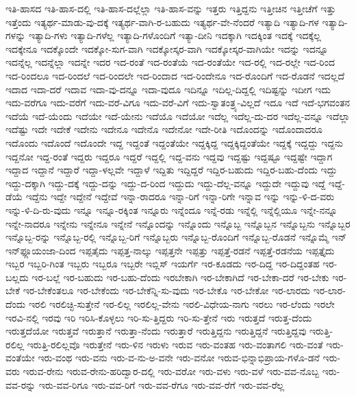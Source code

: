 {ಇತಿ-ಹಾಸದ
ಇತಿ-ಹಾಸ-ದಲ್ಲಿ
ಇತಿ-ಹಾಸ-ದಲ್ಲೆಲ್ಲಾ
ಇತಿ-ಹಾಸ-ವನ್ನು
ಇತ್ತರು
ಇತ್ತಿದ್ದನು
ಇತ್ತೀಚಿನ
ಇತ್ತೀಚೆಗೆ
ಇತ್ತು
ಇತ್ತೆಂದು
ಇತ್ಯರ್ಥ-ಮಾಡು-ವು-ದಕ್ಕೆ
ಇತ್ಯರ್ಥ-ವಾಗಿ-ರ-ಬಹುದು
ಇತ್ಯರ್ಥ-ವೇ-ನೆಂದರೆ
ಇತ್ಯಾದಿ
ಇತ್ಯಾದಿ-ಗಳ
ಇತ್ಯಾದಿ-ಗಳನ್ನು
ಇತ್ಯಾದಿ-ಗಳು
ಇತ್ಯಾದಿ-ಗಳೆಲ್ಲ
ಇತ್ಯಾದಿ-ಗಳೊಂದಿಗೆ
ಇತ್ಯಾ-ದೀನಿ
ಇದಕ್ಕಾಗಿ
ಇದಕ್ಕಿಂತ
ಇದಕ್ಕೆ
ಇದಕ್ಕೆಲ್ಲ
ಇದಕ್ಕೇನೂ
ಇದಕ್ಕೊಂದೇ
ಇದಕ್ಕೋ-ಸುಗ-ವಾಗಿ
ಇದಕ್ಕೋಸ್ಕರ-ವಾಗಿ
ಇದಕ್ಕೋಸ್ಕರ-ವಾಗಿಯೇ
ಇದನ್ನು
ಇದನ್ನೂ
ಇದನ್ನೆಲ್ಲ
ಇದನ್ನೆಲ್ಲಾ
ಇದನ್ನೇ
ಇದರ
ಇದ-ರಂತೆ
ಇದ-ರಂತೆಯೆ
ಇದ-ರಂತೆಯೇ
ಇದ-ರಲ್ಲಿ
ಇದ-ರಲ್ಲೇ
ಇದ-ರಿಂದ
ಇದ-ರಿಂದಲೂ
ಇದ-ರಿಂದಲೆ
ಇದ-ರಿಂದಲೇ
ಇದ-ರಿಂದಾದ
ಇದ-ರಿಂದೇನೂ
ಇದ-ರೊಂದಿಗೆ
ಇದ-ರೊಡನೆ
ಇದಲ್ಲದೆ
ಇದಾದ
ಇದಾ-ದರೆ
ಇದಾವ
ಇದಾ-ವು-ದನ್ನೂ
ಇದಾ-ವುದೂ
ಇದಿನ್ನೂ
ಇದಿಲ್ಲ-ದಿದ್ದಲ್ಲಿ
ಇದಿಷ್ಟನ್ನು
ಇದೀಗ
ಇದು
ಇದು-ವರೆಗೂ
ಇದು-ವರೆಗೆ
ಇದು-ವರೆ-ವಿಗೂ
ಇದು-ವರೆ-ವಿಗೆ
ಇದು-ಸ್ವಾತಂತ್ರ್ಯ-ವಿಲ್ಲದೆ
ಇದೂ
ಇದೆ
ಇದೆ-ಭಗವಂತನ
ಇದೆಯೆ
ಇದೆ-ಯೆಂದು
ಇದೆಯೇ
ಇದೆ-ಯೇನು
ಇದೆಯೊ
ಇದೆಯೋ
ಇದೆಲ್ಲ
ಇದೆಲ್ಲ-ದು-ದರ
ಇದೆಲ್ಲ-ವನ್ನೂ
ಇದೆಲ್ಲಾ
ಇದೆಷ್ಟು
ಇದೇ
ಇದೇಕೆ
ಇದೇನು
ಇದೇನೂ
ಇದೇನೊ
ಇದೇನೋ
ಇದೇ-ರೀತಿ
ಇದೊಂದನ್ನು
ಇದೊಂದಾದರೂ
ಇದೊಂದು
ಇದೊಂದೆ
ಇದೊಂದೇ
ಇದ್ದ
ಇದ್ದಂತೆ
ಇದ್ದಂತೆಯೇ
ಇದ್ದಕ್ಕಿದ್ದ
ಇದ್ದಕ್ಕಿದ್ದಂತೆಯೇ
ಇದ್ದಕ್ಕೆ
ಇದ್ದದ್ದು
ಇದ್ದನು
ಇದ್ದನೋ
ಇದ್ದ-ರಂತೆ
ಇದ್ದರು
ಇದ್ದರೂ
ಇದ್ದರೆ
ಇದ್ದಲ್ಲಿ
ಇದ್ದ-ವನು
ಇದ್ದವು
ಇದ್ದಷ್ಟು
ಇದ್ದಷ್ಟೂ
ಇದ್ದಷ್ಟೇ
ಇದ್ದಾಗ
ಇದ್ದಾದ
ಇದ್ದಾನೆ
ಇದ್ದಾರೆ
ಇದ್ದಾ-ಳಲ್ಲವೇ
ಇದ್ದಾಳೆ
ಇದ್ದಿತು
ಇದ್ದಿದ್ದರೆ
ಇದ್ದಿರ-ಬಹುದು
ಇದ್ದಿರ-ಬಹು-ದೆಂದು
ಇದ್ದು
ಇದ್ದು-ದಕ್ಕಾಗಿ
ಇದ್ದು-ದಕ್ಕೆ
ಇದ್ದು-ದನ್ನು
ಇದ್ದು-ದ-ರಿಂದ
ಇದ್ದುದು
ಇದ್ದು-ದೆಲ್ಲ-ವನ್ನೂ
ಇದ್ದುದೇ
ಇದ್ದುವು
ಇದ್ದೆ
ಇದ್ದೆ-ಡೆಯೆ
ಇದ್ದೆನು
ಇದ್ದೇ
ಇದ್ದೇನೆ
ಇದ್ದೇವೆ
ಇನ್ನಾ-ರಾದರೂ
ಇನ್ನಾ-ರಿಗೆ
ಇನ್ನಾ-ರಿಗೇ
ಇನ್ನಾವ
ಇನ್ನು
ಇನ್ನು-ಳಿ-ದ-ವರು
ಇನ್ನು-ಳಿ-ದಿ-ರು-ವುದು
ಇನ್ನೂ
ಇನ್ನೂ-ರಕ್ಕಿಂತ
ಇನ್ನೂರು
ಇನ್ನೆಂದೂ
ಇನ್ನೆ-ರಡು
ಇನ್ನೆಲ್ಲಿ
ಇನ್ನೆಲ್ಲಿಯೂ
ಇನ್ನೇ-ನನ್ನೂ
ಇನ್ನೇ-ನಾದರೂ
ಇನ್ನೇನು
ಇನ್ನೇನೂ
ಇನ್ನೇನೆ
ಇನ್ನೊಂದನ್ನು
ಇನ್ನೊಂದು
ಇನ್ನೊಬ್ಬ
ಇನ್ನೊಬ್ಬನ
ಇನ್ನೊಬ್ಬನು
ಇನ್ನೊಬ್ಬರ
ಇನ್ನೊಬ್ಬ-ರನ್ನು
ಇನ್ನೊಬ್ಬ-ರಲ್ಲಿ
ಇನ್ನೊಬ್ಬ-ರಿಗೆ
ಇನ್ನೊಬ್ಬರು
ಇನ್ನೊಬ್ಬ-ರೊಂದಿಗೆ
ಇನ್ನೊಬ್ಬ-ರೊಡನೆ
ಇನ್ನೊಮ್ಮೆ
ಇನ್‌
ಇನ್‌ಫ್ಲೂಯಂಜಾ-ದಿಂದ
ಇಪ್ಪತೈದು
ಇಪ್ಪತ್ತ-ನಾಲ್ಕು
ಇಪ್ಪತ್ತನೇ
ಇಪ್ಪತ್ತು
ಇಪ್ಪತ್ತೆ-ರಡನೆ
ಇಪ್ಪತ್ತೆ-ರಡನೆಯ
ಇಪ್ಪತ್ತೈದು
ಇಬ್ಬರ
ಇಬ್ಬರಿ-ಗಿಂತ
ಇಬ್ಬರು
ಇಬ್ಬರೂ
ಇಬ್ಬರೇ
ಇಬ್ಲಿಸ್
ಇಯರ್ಗೆ
ಇರ-ಕೂಡದು
ಇರ-ದಿದ್ದ
ಇರ-ದಿದ್ದಂತಹ
ಇರ-ಬಲ್ಲದು
ಇರ-ಬಲ್ಲೆ
ಇರ-ಬಹುದು
ಇರ-ಬಹು-ದೆಂದು
ಇರಬೇಕಾಗಿ
ಇರ-ಬೇಕಾಗಿದೆ
ಇರ-ಬೇಕಾ-ದರೆ
ಇರ-ಬೇಕು
ಇರ-ಬೇಕೆ
ಇರ-ಬೇಕೆಂತಲೂ
ಇರ-ಬೇಕೆಂದು
ಇರ-ಬೇಕೆನ್ನಿ-ಸು-ವುದು
ಇರ-ಬೇಕೊ
ಇರ-ಬೇಕೋ
ಇರ-ಲಾರದು
ಇರ-ಲಾರ-ದೆಂದು
ಇರಲಿ
ಇರಲಿಚ್ಛಿ-ಸುತ್ತೇನೆ
ಇರ-ಲಿಲ್ಲ
ಇರಲಿಲ್ಲ-ವೇನು
ಇರಲಿ-ವಿಧೇಯ-ನಾಗು
ಇರಲು
ಇರ-ಲೆಂದು
ಇರಲೇ
ಇರವಿ-ನಲ್ಲಿ
ಇರವು
ಇರಿ
ಇರಿಸಿ-ಕೊಳ್ಳಲು
ಇರಿ-ಸು-ತ್ತಿದ್ದರು
ಇರಿ-ಸು-ತ್ತೇನೆ
ಇರು
ಇರುತ್ತದೆ
ಇರುತ್ತ-ದೆಂದು
ಇರುತ್ತದೆಯೋ
ಇರುತ್ತವೆ
ಇರುತ್ತಾನೆ
ಇರುತ್ತಾ-ನೆಂದು
ಇರುತ್ತಾರೆ
ಇರುತ್ತಿದ್ದನು
ಇರುತ್ತಿದ್ದನೆ
ಇರುತ್ತಿದ್ದವು
ಇರುತ್ತಿ-ರಲಿಲ್ಲ
ಇರುತ್ತಿ-ರಲಿಲ್ಲವೊ
ಇರುತ್ತೇನೆ
ಇರು-ಳಿನ
ಇರುಳು
ಇರುವ
ಇರು-ವಂತಹ
ಇರು-ವಂತಾಗಲಿ
ಇರು-ವಂತೆ
ಇರು-ವಂತೆಯೇ
ಇರು-ವಂಥ
ಇರು-ವನು
ಇರು-ವ-ನು-ಅ-ವನೇ
ಇರು-ವನೋ
ಇರುವ-ಭಿನ್ನಾಭಿಪ್ರಾಯ-ಗಳೊ-ಡನೆ
ಇರು-ವರು
ಇರುವ-ರೇನು
ಇರುವ-ರೇನು-ಹರಿದ್ವಾರ-ದಲ್ಲಿ
ಇರು-ವರೋ
ಇರು-ವಳು
ಇರು-ವಳೆ
ಇರು-ವವ-ನೊಬ್ಬ
ಇರು-ವವ-ರನ್ನು
ಇರು-ವವ-ರಿಗೂ
ಇರು-ವವ-ರಿಗೆ
ಇರು-ವವ-ರೆಗೂ
ಇರು-ವವ-ರೆಗೆ
ಇರು-ವವ-ರೆಲ್ಲ
}
